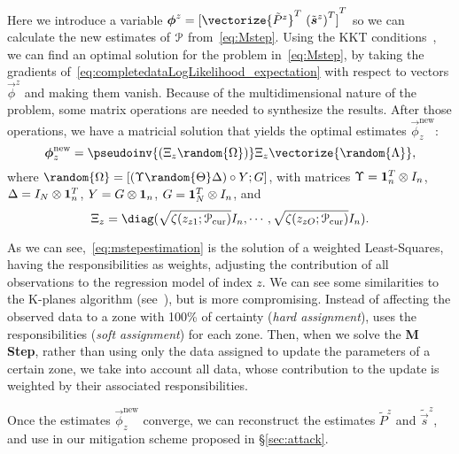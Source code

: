 \documentclass[../main.tex]{subfiles}
\begin{document}
Here we introduce a variable ${\vec{\phi}^{z}={[\vectorize{\tilde{P}^{z}}^{T}\ {(\tilde{\vec{s}}^{z})}^{T} ]}^{T}}$ so we can calculate the new estimates of $\mathcal{P}$ from~\eqref{eq:Mstep}. Using the KKT conditions~\cite{BoydVandenberghe2004}, we can find an optimal solution for the problem in~\eqref{eq:Mstep}, by
taking the gradients of~\eqref{eq:completedataLogLikelihood_expectation} with respect to vectors $\vec{\phi}^{z}$ and making them vanish.
Because of the multidimensional nature of the problem, some matrix operations are needed to synthesize the results.
After those operations, we have a matricial solution that yields the optimal estimates $\vec{\phi}_{z}^{\mathrm{new}}$:
\begin{equation}
  \label{eq:mstepestimation}
  \vec{\phi}_{z}^{\mathrm{new}}=\pseudoinv{(\Xi_{z}\random{\Omega})}\Xi_{z}\vectorize{\random{\Lambda}},
\end{equation}
where
${\random{\Omega}=[\hadamard{(\Upsilon \random{\Theta}\Delta)}{Y};G]}$,
with matrices
${\Upsilon=\mathbf{1}_{n}^{T}\otimes I_{n}}$,
${\Delta=I_{N}\otimes\mathbf{1}_{n}^{T}}$,
${Y=G\otimes\mathbf{1}_{n}}$,
${G=\mathbf{1}_{N}^{T}\otimes I_{n}}$,
and
\[{\Xi_{z}={\diag(\sqrt{{\zeta(z_{z1};\set{P}_{\mathrm{cur}})}}I_{n},\cdots,\sqrt{{\zeta(z_{zO};\set{P}_{\mathrm{cur}})}}I_{n})}}.\]

As we can see,~\eqref{eq:mstepestimation} is the solution of a weighted Least-Squares, having the responsibilities as weights, adjusting the contribution of all observations to the regression model of index $z$.
We can see some similarities to the K-planes algorithm (see~\cite{BradleyMangasarian2000}), but \EM{} is more compromising.
Instead of affecting the observed data to a zone with 100\% of certainty (\emph{hard assignment}), \EM{} uses the responsibilities (\emph{soft assignment}) for each zone.
Then, when we solve the \textbf{M Step}, rather than using only the data assigned to update the parameters of a certain zone, we take into account all data, whose contribution to the update is weighted by their associated responsibilities.


Once the estimates $\vec{\phi}_{z}^{\mathrm{new}}$ converge, we can reconstruct the estimates $\tilde{P}^{z}$ and $\tilde{\vec{s}}^{z}$, and use in our mitigation scheme proposed in \S\ref{sec:attack}.

\end{document}
